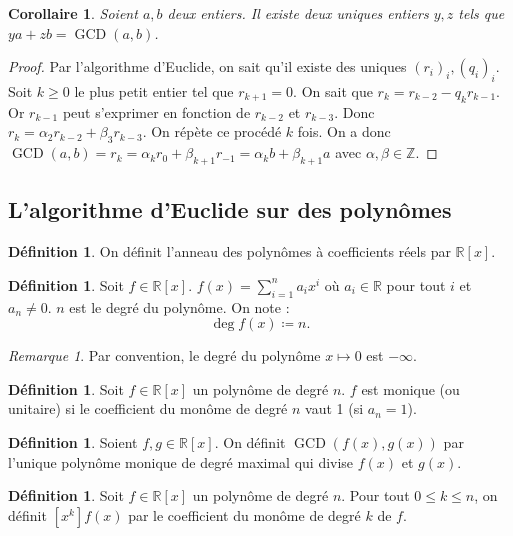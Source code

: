 \documentclass{article}
\DeclareMathOperator{\GCD}{GCD}
\newcommand{\Z}{\mathbb Z}
\newcommand{\R}{\mathbb R}
\newtheorem{cor}[thm]{Corollaire}
\theoremstyle{definition}
\newtheorem{déf}[thm]{Définition}
\theoremstyle{remark}
\newtheorem*{rmq}{Remarque}
\begin{document}
		\begin{cor} Soient $a, b$ deux entiers. Il existe deux uniques entiers $y, z$ tels que $ya + zb = \GCD(a, b)$. \end{cor}

		\begin{proof} Par l'algorithme d'Euclide, on sait qu'il existe des uniques $(r_i)_i, (q_i)_i$. Soit $k \geq 0$ le plus petit entier tel que $r_{k+1} = 0$. On sait
		que $r_k = r_{k-2} - q_kr_{k-1}$. Or $r_{k-1}$ peut s'exprimer en fonction de $r_{k-2}$ et $r_{k-3}$. Donc $r_k = \alpha_2r_{k-2}+\beta_3r_{k-3}$.
		On répète ce procédé $k$ fois. On a donc $\GCD(a, b) = r_k = \alpha_kr_0 + \beta_{k+1}r_{-1} = \alpha_kb + \beta_{k+1}a$ avec $\alpha, \beta \in \Z$. \end{proof}
	
	\subsection{L'algorithme d'Euclide sur des polynômes}
		\begin{déf} On définit l'anneau des polynômes à coefficients réels par $\R[x]$. \end{déf}

		\begin{déf} Soit $f \in \R[x]$. $\displaystyle f(x) = \sum_{i=1}^na_ix^i$ où $a_i \in \R$ pour tout $i$ et $a_n \neq 0$. $n$ est le degré du polynôme.
		On note :\[\deg f(x) \coloneqq n.\] \end{déf}

		\begin{rmq} Par convention, le degré du polynôme $x \mapsto 0$ est $-\infty$. \end{rmq}

		\begin{déf} Soit $f \in \R[x]$ un polynôme de degré $n$. $f$ est monique (ou unitaire) si le coefficient du monôme de degré $n$ vaut 1 (si $a_n = 1$). \end{déf}

		\begin{déf} Soient $f, g \in \R[x]$. On définit $\GCD(f(x), g(x))$ par l'unique polynôme monique de degré maximal qui divise $f(x)$ et $g(x)$. \end{déf}

		\begin{déf} Soit $f \in \R[x]$ un polynôme de degré $n$. Pour tout $0 \leq k \leq n$, on définit $[x^k]f(x)$ par le coefficient du monôme de degré $k$ de $f$. \end{déf}
\end{document}
